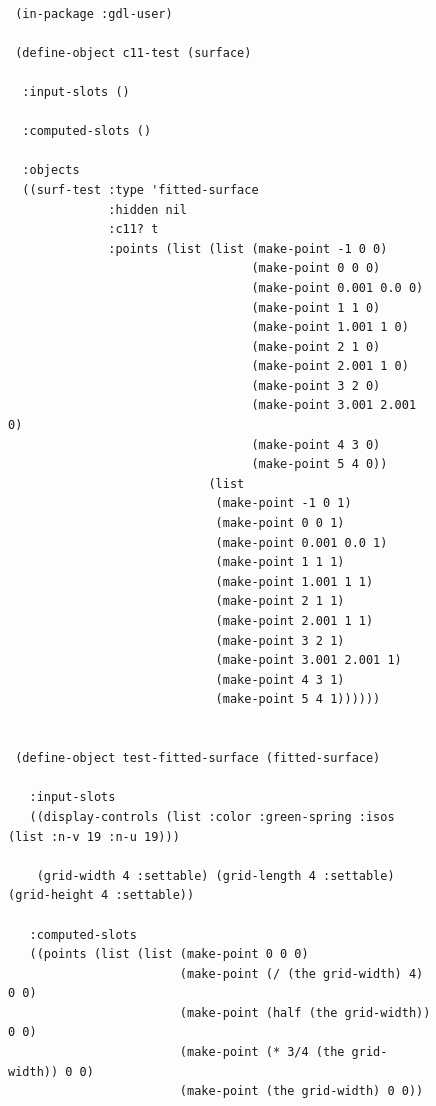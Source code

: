 \documentclass [11pt]{book}
\begin{document}
\begin{itemize}
\begin{description}
\end{description}




\begin{figure}
\begin{lrbox}{\boxedverb}
\begin{minipage}{\linewidth}
{\small

\begin{verbatim}

 (in-package :gdl-user)

 (define-object c11-test (surface) 

  :input-slots () 

  :computed-slots ()

  :objects
  ((surf-test :type 'fitted-surface
              :hidden nil
              :c11? t
              :points (list (list (make-point -1 0 0)
                                  (make-point 0 0 0) 
                                  (make-point 0.001 0.0 0)
                                  (make-point 1 1 0)
                                  (make-point 1.001 1 0)
                                  (make-point 2 1 0)
                                  (make-point 2.001 1 0)
                                  (make-point 3 2 0)
                                  (make-point 3.001 2.001 0)
                                  (make-point 4 3 0) 
                                  (make-point 5 4 0))   
                            (list
                             (make-point -1 0 1)
                             (make-point 0 0 1) 
                             (make-point 0.001 0.0 1)
                             (make-point 1 1 1)
                             (make-point 1.001 1 1)
                             (make-point 2 1 1)
                             (make-point 2.001 1 1)
                             (make-point 3 2 1)
                             (make-point 3.001 2.001 1)
                             (make-point 4 3 1)
                             (make-point 5 4 1))))))


 (define-object test-fitted-surface (fitted-surface) 

   :input-slots
   ((display-controls (list :color :green-spring :isos (list :n-v 19 :n-u 19)))
   
    (grid-width 4 :settable) (grid-length 4 :settable) (grid-height 4 :settable))
  
   :computed-slots
   ((points (list (list (make-point 0 0 0)
                        (make-point (/ (the grid-width) 4) 0 0)
                        (make-point (half (the grid-width)) 0 0)
                        (make-point (* 3/4 (the grid-width)) 0 0)
                        (make-point (the grid-width) 0 0))
                         

\end{verbatim}}
\end{minipage}
\end{lrbox}
\end{figure}
\end{itemize}
\end{document}
